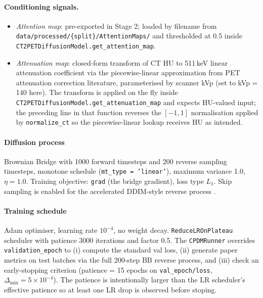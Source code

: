 \documentclass[11pt,a4paper]{article}
\begin{document}
\paragraph{Conditioning signals.}
\begin{itemize}
  \item \emph{Attention map}: pre-exported in Stage 2; loaded by filename from 
  \texttt{data/processed/\{split\}/AttentionMaps/} and thresholded at 0.5 inside 
  \texttt{CT2PETDiffusionModel.get\_attention\_map}.
  \item \emph{Attenuation map}: closed-form transform of CT HU to 511\,keV linear
  attenuation coefficient via the piecewise-linear approximation from PET
  attenuation correction literature, parameterised by scanner kVp (set to
  kVp = 140 here). The transform is applied on the fly inside
  \texttt{CT2PETDiffusionModel.get\_attenuation\_map} and expects HU-valued
  input; the preceding line in that function reverses the $[-1, 1]$
  normalisation applied by \texttt{normalize\_ct} so the piecewise-linear
  lookup receives HU as intended.
\end{itemize}

\paragraph{Diffusion process} Brownian Bridge \parencite{li2023bbdm} with 
1000 forward timesteps and 200 reverse sampling timesteps, monotone schedule 
(\texttt{mt\_type = 'linear'}), maximum variance 1.0, $\eta = 1.0$. 
Training objective: \texttt{grad} (the bridge gradient), loss type 
$L_1$. Skip sampling is enabled for the accelerated DDIM-style reverse 
process \parencite{song2022ddim}.

\paragraph{Training schedule} Adam optimiser, learning rate $10^{-4}$, 
no weight decay. \texttt{ReduceLROnPlateau} scheduler 
\parencite{robbins1951stochastic} with patience 3000 
iterations and factor 0.5. The \texttt{CPDMRunner} overrides 
\texttt{validation\_epoch} to (i) compute the standard val loss, 
(ii) generate paper metrics on test batches via the full 
200-step BB reverse process, and (iii) check an early-stopping 
criterion (patience = 15 epochs on \texttt{val\_epoch/loss}, 
$\Delta_{\min} = 5 \times 10^{-4}$). The patience is intentionally 
larger than the LR scheduler's effective patience so at least one 
LR drop is observed before stoping.
\end{document}
